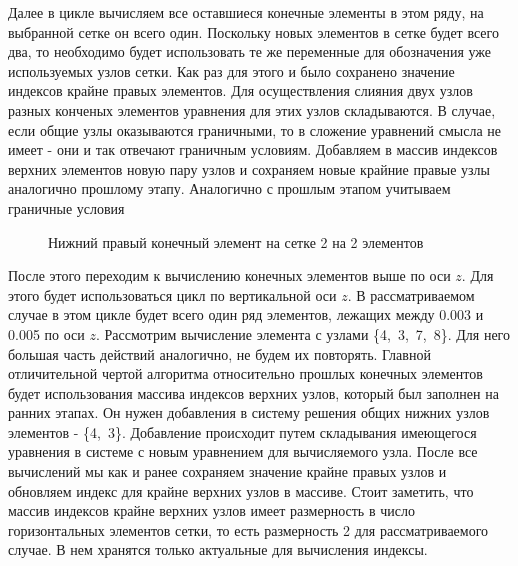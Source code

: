 \documentclass[12pt, a4paper]{article}
\begin{document}
Далее в цикле вычисляем все оставшиеся конечные элементы в этом ряду, на выбранной сетке он всего один. Поскольку новых элементов в сетке будет всего два, то необходимо будет использовать те же переменные для обозначения уже используемых узлов сетки. Как раз для этого и было сохранено значение индексов крайне правых элементов. Для осуществления слияния двух узлов разных конченых элементов уравнения для этих узлов складываются. В случае, если общие узлы оказываются граничными, то в сложение уравнений смысла не имеет - они и так отвечают граничным условиям. Добавляем в массив индексов верхних элементов новую пару узлов и сохраняем новые крайние правые узлы аналогично прошлому этапу. Аналогично с прошлым этапом учитываем граничные условия
\begin{figure}[!htbp]
	\caption{Нижний правый конечный элемент на сетке 2 на 2 элементов}
	\label{right-bottom-el}
\end{figure}
\newpage
После этого переходим к вычислению конечных элементов выше по оси $z$.  Для этого будет использоваться цикл по вертикальной оси $z$. В рассматриваемом случае в этом цикле будет всего один ряд элементов, лежащих между 0.003 и 0.005 по оси $z$.
Рассмотрим вычисление элемента с узлами \{4,~3,~7,~8\}. Для него большая часть действий аналогично, не будем их повторять. Главной отличительной чертой алгоритма относительно прошлых конечных элементов будет использования массива индексов верхних узлов, который был заполнен на ранних этапах. Он нужен добавления в систему решения общих нижних узлов элементов - \{4,~3\}. Добавление происходит путем складывания имеющегося уравнения в системе с новым уравнением для вычисляемого узла. После все вычислений мы как и ранее сохраняем значение крайне правых узлов и обновляем индекс для крайне верхних узлов в массиве. Стоит заметить, что массив индексов крайне верхних узлов имеет размерность в число горизонтальных элементов сетки, то есть размерность 2 для рассматриваемого случае. В нем хранятся только актуальные для вычисления индексы.
\end{document}
